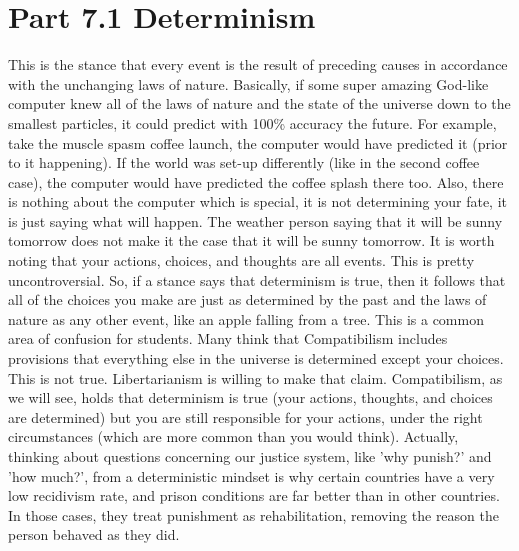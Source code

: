 \section{Part 7.1 Determinism}

This is the stance that every event is the result of preceding causes in accordance with the unchanging laws of nature. Basically, if some super amazing God-like computer knew all of the laws of nature and the state of the universe down to the smallest particles, it could predict with 100\% accuracy the future. For example, take the muscle spasm coffee launch, the computer would have predicted it (prior to it happening). If the world was set-up differently (like in the second coffee case), the computer would have predicted the coffee splash there too. Also, there is nothing about the computer which is special, it is not determining your fate, it is just saying what will happen. The weather person saying that it will be sunny tomorrow does not make it the case that it will be sunny tomorrow. It is worth noting that your actions, choices, and thoughts are all events. This is pretty uncontroversial. So, if a stance says that determinism is true, then it follows that all of the choices you make are just as determined by the past and the laws of nature as any other event, like an apple falling from a tree. This is a common area of confusion for students. Many think that Compatibilism includes provisions that everything else in the universe is determined except your choices. This is not true. Libertarianism is willing to make that claim. Compatibilism, as we will see, holds that determinism is true (your actions, thoughts, and choices are determined) but you are still responsible for your actions, under the right circumstances (which are more common than you would think).  Actually, thinking about questions concerning our justice system, like 'why punish?' and 'how much?', from a deterministic mindset is why certain countries have a very low recidivism rate, and prison conditions are far better than in other countries. In those cases, they treat punishment as rehabilitation, removing the reason the person behaved as they did. 

